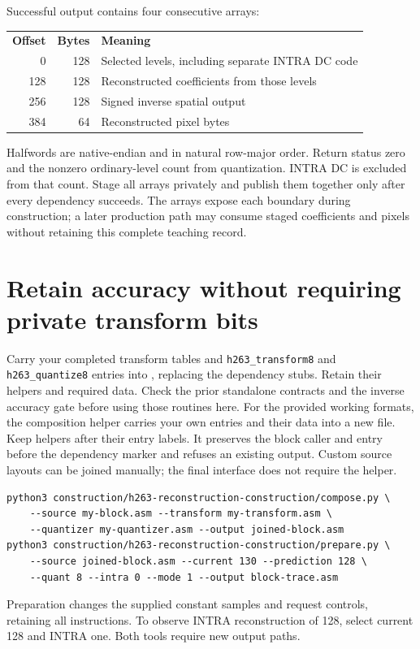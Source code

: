 Successful output contains four consecutive arrays:
\begin{center}
  \begin{tabular}{rrl}
    \textbf{Offset} & \textbf{Bytes} & \textbf{Meaning}                                  \\
    0               & 128            & Selected levels, including separate INTRA DC code \\
    128             & 128            & Reconstructed coefficients from those levels      \\
    256             & 128            & Signed inverse spatial output                     \\
    384             & 64             & Reconstructed pixel bytes
  \end{tabular}
\end{center}
Halfwords are native-endian and in natural row-major order. Return status zero
and the nonzero ordinary-level count from quantization. INTRA DC is excluded
from that count. Stage all arrays privately and publish them together only after
every dependency succeeds. The arrays expose each boundary during construction;
a later production path may consume staged coefficients and pixels without
retaining this complete teaching record.

\section{Retain accuracy without requiring private transform bits}
Carry your completed transform tables and \texttt{h263\_transform8} and
\texttt{h263\_quantize8} entries into
, replacing the dependency
stubs. Retain their helpers and required data. Check the prior standalone contracts
and the inverse accuracy gate before using those routines here.
For the provided working formats, the composition helper carries your own entries
and their data into a new file. Keep helpers after their entry labels. It preserves
the block caller and entry before the dependency marker and refuses an existing
output. Custom source layouts can be joined manually; the final interface does
not require the helper.
\begin{verbatim}
python3 construction/h263-reconstruction-construction/compose.py \
    --source my-block.asm --transform my-transform.asm \
    --quantizer my-quantizer.asm --output joined-block.asm
python3 construction/h263-reconstruction-construction/prepare.py \
    --source joined-block.asm --current 130 --prediction 128 \
    --quant 8 --intra 0 --mode 1 --output block-trace.asm
\end{verbatim}
Preparation changes the supplied constant samples and request controls, retaining
all instructions. To observe INTRA reconstruction of 128, select current 128
and INTRA one. Both tools require new output paths.

